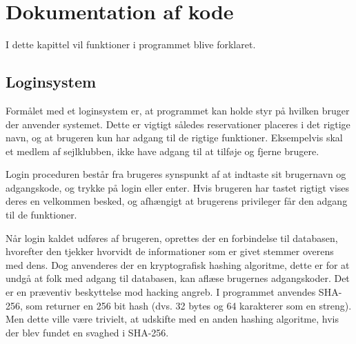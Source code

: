 \chapter{Dokumentation af kode} \label{chap:kode_docs}
I dette kapittel vil funktioner i programmet blive forklaret.

\section{Loginsystem} \label{sec:login}
Formålet med et loginsystem er, at programmet kan holde styr på hvilken bruger der anvender systemet. 
Dette er vigtigt således reservationer placeres i det rigtige navn, og at brugeren kun har adgang til de rigtige funktioner. 
Eksempelvis skal et medlem af sejlklubben, ikke have adgang til at tilføje og fjerne brugere. 

Login proceduren består fra brugeres synspunkt af at indtaste sit brugernavn og adgangskode, og trykke på login eller enter. 
Hvis brugeren har tastet rigtigt vises deres en velkommen besked, og afhængigt at brugerens privileger får den adgang til de funktioner.

Når login kaldet udføres af brugeren, oprettes der en forbindelse til databasen, hvorefter den tjekker hvorvidt de informationer som er givet stemmer overens med dens. 
Dog anvenderes der en kryptografisk hashing algoritme, dette er for at undgå at folk med adgang til databasen, kan aflæse brugernes adgangskoder.
Det er en præventiv beskyttelse mod hacking angreb.
I programmet anvendes SHA-256, som returner en 256 bit hash (dvs. 32 bytes og 64 karakterer som en streng). 
Men dette ville være trivielt, at udskifte med en anden hashing algoritme, hvis der blev fundet en svaghed i SHA-256. 
